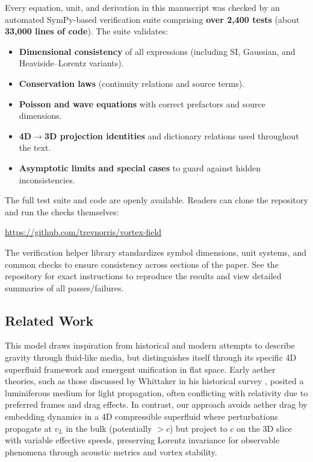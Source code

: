 Every equation, unit, and derivation in this manuscript was checked by an automated SymPy-based verification suite comprising \textbf{over 2{,}400 tests} (about \textbf{33{,}000 lines of code}). The suite validates:
\begin{itemize}
  \item \textbf{Dimensional consistency} of all expressions (including SI, Gaussian, and Heaviside–Lorentz variants).
  \item \textbf{Conservation laws} (continuity relations and source terms).
  \item \textbf{Poisson and wave equations} with correct prefactors and source dimensions.
  \item \textbf{4D$\to$3D projection identities} and dictionary relations used throughout the text.
  \item \textbf{Asymptotic limits and special cases} to guard against hidden inconsistencies.
\end{itemize}

The full test suite and code are openly available. Readers can clone the repository and run the checks themselves:
\begin{center}
\url{https://github.com/trevnorris/vortex-field}
\end{center}

The verification helper library standardizes symbol dimensions, unit systems, and common checks to ensure consistency across sections of the paper. See the repository for exact instructions to reproduce the results and view detailed summaries of all passes/failures.

\subsection{Related Work}

This model draws inspiration from historical and modern attempts to describe gravity through fluid-like media, but distinguishes itself through its specific 4D superfluid framework and emergent unification in flat space. Early aether theories, such as those discussed by Whittaker in his historical survey \cite{whittaker1951history}, posited a luminiferous medium for light propagation, often conflicting with relativity due to preferred frames and drag effects. In contrast, our approach avoids aether drag by embedding dynamics in a 4D compressible superfluid where perturbations propagate at $v_L$ in the bulk (potentially $>c$) but project to $c$ on the 3D slice with variable effective speeds, preserving Lorentz invariance for observable phenomena through acoustic metrics and vortex stability.

